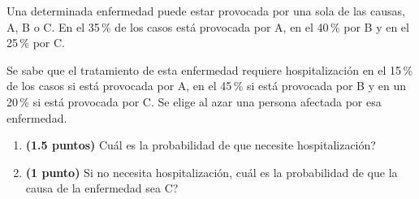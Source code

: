 
Una determinada enfermedad puede estar provocada por una sola de las causas,
A, B o C. En el 35\,\% de los casos está provocada por A, en el 40\,\% por B
y en el 25\,\% por C.

Se sabe que el tratamiento de esta enfermedad requiere hospitalización en el
15\,\% de los casos si está provocada por A, en el 45\,\% si está provocada
por B y en un 20\,\% si está provocada por C. Se elige al azar una persona
afectada por esa enfermedad.
\begin{enumerate}[label=\alph*)]
  \item \textbf{(1.5 puntos)} \textquestiondown{}Cuál es la probabilidad de
  que necesite hospitalización?
  \item \textbf{(1 punto)} Si no necesita hospitalización,
  \textquestiondown{}cuál es la probabilidad de que la causa de la enfermedad
  sea C?
\end{enumerate}
